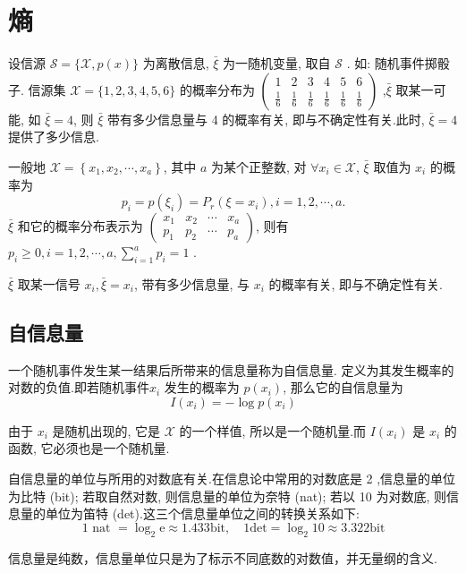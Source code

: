 \section{熵}
设信源 $ \mathscr{S}=\{\mathscr{X}, p(x)\} $ 为离散信息, $ \bar{\xi} $ 为一随机变量, 取自 $ \mathscr{S} $ . 如: 随机事件掷骰子. 信源集 $ \mathscr{X}=\{1,2,3,4,5,6\} $ 的概率分布为 $ \left(\begin{array}{cccccc}1 & 2 & 3 & 4 & 5 & 6 \\ \frac{1}{6} & \frac{1}{6} & \frac{1}{6} & \frac{1}{6} & \frac{1}{6} & \frac{1}{6}\end{array}\right) $ ,$ \bar{\xi} $ 取某一可能, 如 $ \bar{\xi}=4 $, 则 $ \bar{\xi} $ 带有多少信息量与 4 的概率有关, 即与不确定性有关.此时, $ \bar{\xi}=4 $ 提供了多少信息.


一般地 $ \mathscr{X}=\left\{x_{1}, x_{2}, \cdots, x_{a}\right\} $, 其中 $ a $ 为某个正整数, 对 $ \forall x_{i} \in \mathscr{X} $, $ \bar{\xi} $ 取值为 $ x_{i} $ 的概率为
$$
p_{i}=p\left(\xi_{i}\right)=P_{r}\left(\xi=x_{i}\right), i=1,2, \cdots, a .
$$
$ \bar{\xi} $ 和它的概率分布表示为 $ \left(\begin{array}{llll}x_{1} & x_{2} & \cdots & x_{a} \\ p_{1} & p_{2} & \cdots & p_{a}\end{array}\right) $, 
则有 $ p_{i} \geqslant 0, i=1,2, \cdots, a, \sum\limits_{i=1}^{a} p_{i}=1 $ .

$ \bar{\xi} $ 取某一信号 $ x_{i}, \bar{\xi}=x_{i} $, 带有多少信息量, 与 $ x_{i} $ 的概率有关, 即与不确定性有关.

\subsection{自信息量}
\begin{definition}
    一个随机事件发生某一结果后所带来的信息量称为自信息量. 定义为其发生概率的对数的负值.即若随机事件$x_i$ 发生的概率为 $p(x_i)$, 那么它的自信息量为 $$I(x_i)=-\log p(x_i)$$
\end{definition}

由于 $ x_{i} $ 是随机出现的, 它是 $ \mathscr{X} $ 的一个样值, 所以是一个随机量.而 $ I\left(x_{i}\right) $ 是 $ x_{i} $ 的函数, 它必须也是一个随机量.

自信息量的单位与所用的对数底有关.在信息论中常用的对数底是 2 ,信息量的单位为比特 (bit); 若取自然对数, 则信息量的单位为奈特 (nat); 若以 10 为对数底, 则信息量的单位为笛特 (det).这三个信息量单位之间的转换关系如下:
$$
1 \text { nat }=\log _{2} \mathrm{e} \approx 1.433 \mathrm{bit}, \quad 1 \mathrm{det}=\log _{2} 10 \approx 3.322 \mathrm{bit}
$$
\begin{note}
    信息量是纯数，信息量单位只是为了标示不同底数的对数值，并无量纲的含义.
\end{note}


